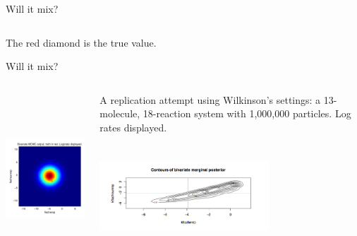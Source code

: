 \documentclass[12pt,a4paper,t,xcolor=dvipsnames,slidestop,compress,mathserif]{beamer}
\begin{document}
\begin{frame}{Will it mix?}
\begin{columns}[c]
\begin{column}{0.80\textwidth}
\end{column}
\end{columns}
The red diamond is the true value.
\end{frame}
\begin{frame}{Will it mix?}

\begin{columns}[c]

\begin{column}{0.5\textwidth}
\includegraphics[height=2.5in,width=2.5in]{SigD_trial_large_bw_may_29.png}
\end{column}

\begin{column}{0.5\textwidth}
A replication attempt using Wilkinson's settings: a 13-molecule, 18-reaction system with 1,000,000 particles. Log rates displayed.

\includegraphics[height=1.5in,width=2.5in]{wilkinson_fig3_biv.png}
\end{column}
\end{columns}
\end{frame}
\end{document}
